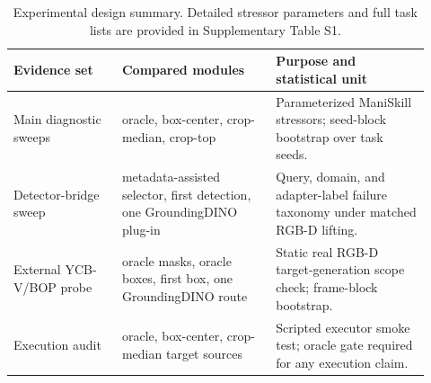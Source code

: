 \begin{table}[t]
\centering
\caption{Experimental design summary. Detailed stressor parameters and full task lists are provided in Supplementary Table S1.}
\label{tab:scirep-experiment-design}
\scriptsize
\setlength{\tabcolsep}{3pt}
\begin{tabular}{p{0.24\linewidth}p{0.34\linewidth}p{0.34\linewidth}}
\toprule
Evidence set & Compared modules & Purpose and statistical unit \\
\midrule
Main diagnostic sweeps & oracle, box-center, crop-median, crop-top & Parameterized ManiSkill stressors; seed-block bootstrap over task seeds. \\
Detector-bridge sweep & metadata-assisted selector, first detection, one GroundingDINO plug-in & Query, domain, and adapter-label failure taxonomy under matched RGB-D lifting. \\
External YCB-V/BOP probe & oracle masks, oracle boxes, first box, one GroundingDINO route & Static real RGB-D target-generation scope check; frame-block bootstrap. \\
Execution audit & oracle, box-center, crop-median target sources & Scripted executor smoke test; oracle gate required for any execution claim. \\
\bottomrule
\end{tabular}
\end{table}
